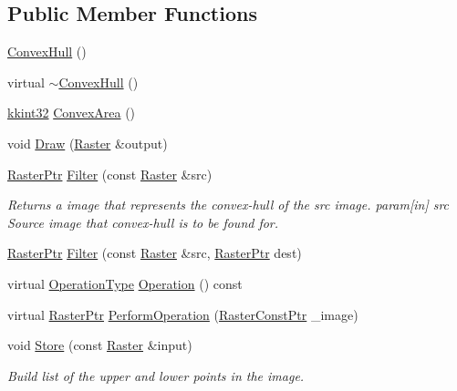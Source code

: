 \subsection*{Public Member Functions}
\begin{DoxyCompactItemize}
\item 
\hyperlink{class_k_k_b_1_1_convex_hull_a6ace975a2080ff5ae5adc731db76155c}{Convex\+Hull} ()
\item 
virtual \hyperlink{class_k_k_b_1_1_convex_hull_a7538cdc1c47d38d711aff7c72bb271ba}{$\sim$\+Convex\+Hull} ()
\item 
\hyperlink{namespace_k_k_b_a8fa4952cc84fda1de4bec1fbdd8d5b1b}{kkint32} \hyperlink{class_k_k_b_1_1_convex_hull_a3f6d4a0b84fb968042d1be038d7903ad}{Convex\+Area} ()
\item 
void \hyperlink{class_k_k_b_1_1_convex_hull_a89c8dc3b365746771bfd92475fa18bd9}{Draw} (\hyperlink{class_k_k_b_1_1_raster}{Raster} \&output)
\item 
\hyperlink{namespace_k_k_b_a80d46bd24db644a022c863bce8ae3633}{Raster\+Ptr} \hyperlink{class_k_k_b_1_1_convex_hull_a738c3a3fb1e27c75fd1c5a61bd278cec}{Filter} (const \hyperlink{class_k_k_b_1_1_raster}{Raster} \&src)
\begin{DoxyCompactList}\small\item\em Returns a image that represents the convex-\/hull of the \textquotesingle{}src\textquotesingle{} image. param\mbox{[}in\mbox{]} src Source image that convex-\/hull is to be found for. \end{DoxyCompactList}\item 
\hyperlink{namespace_k_k_b_a80d46bd24db644a022c863bce8ae3633}{Raster\+Ptr} \hyperlink{class_k_k_b_1_1_convex_hull_a429897e8bd2ee8c120797f2f465d2617}{Filter} (const \hyperlink{class_k_k_b_1_1_raster}{Raster} \&src, \hyperlink{namespace_k_k_b_a80d46bd24db644a022c863bce8ae3633}{Raster\+Ptr} dest)
\item 
virtual \hyperlink{class_k_k_b_1_1_morph_op_a32070d9c14d16849873a8a409f5b0d69}{Operation\+Type} \hyperlink{class_k_k_b_1_1_convex_hull_ac540f936d8466f22b98246b2ddb71123}{Operation} () const 
\item 
virtual \hyperlink{namespace_k_k_b_a80d46bd24db644a022c863bce8ae3633}{Raster\+Ptr} \hyperlink{class_k_k_b_1_1_convex_hull_afe5bccb26f94b0a2d72d2864cad51a28}{Perform\+Operation} (\hyperlink{namespace_k_k_b_a5acfa7402dc4df1769f90d3dc8ddfc2c}{Raster\+Const\+Ptr} \+\_\+image)
\item 
void \hyperlink{class_k_k_b_1_1_convex_hull_a055ea906fe75fd90e6b3a12bdad02c5b}{Store} (const \hyperlink{class_k_k_b_1_1_raster}{Raster} \&input)
\begin{DoxyCompactList}\small\item\em Build list of the upper and lower points in the image. \end{DoxyCompactList}\end{DoxyCompactItemize}
